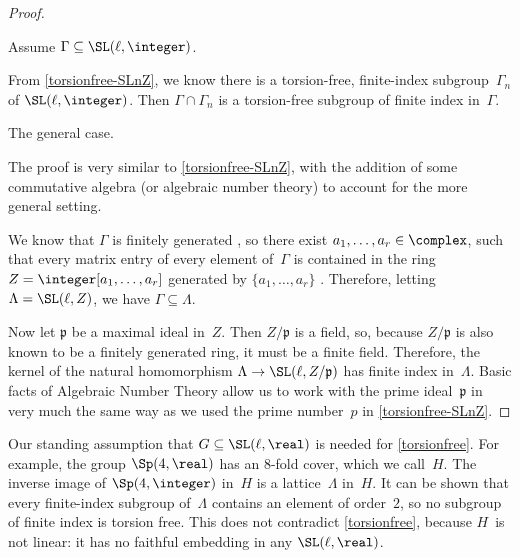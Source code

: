 \begin{proof}
\begin{case}
 Assume $\Gamma \subseteq \SL(\ell,\integer)$.
 \end{case}
  From \cref{torsionfree-SLnZ}, we know there is a
torsion-free, finite-index subgroup~$\Gamma_n$ of
$\SL(\ell, \integer)$. Then $\Gamma \cap \Gamma_n$ is a
torsion-free subgroup of finite index in~$\Gamma$.

\begin{case}
 The general case.
 \end{case}
 The proof is very similar to \cref{torsionfree-SLnZ},
with the addition of some commutative algebra (or
algebraic number theory) to account for the more general
setting.

 We know that $\Gamma$ is finitely generated ,
so there exist $a_1,\ldots,a_r \in \complex$, such that every
matrix entry of every element of~$\Gamma$ is contained in
the ring $Z = \integer[a_1,\ldots,a_r]$ generated by
$\{a_1,\ldots,a_r\}$ . Therefore, letting
 $\Lambda = \SL(\ell, Z)$,
 we have $\Gamma \subseteq \Lambda$.

Now let $\mathfrak{p}$ be a maximal ideal in~$Z$. Then
$Z/\mathfrak{p}$ is a field, so, because $Z/\mathfrak{p}$
is also known to be a finitely generated ring, it must be a
finite field. Therefore, the kernel of the natural homomorphism
$\Lambda \to \SL(\ell, Z/\mathfrak{p})$ has finite index
in~$\Lambda$. Basic facts of Algebraic Number Theory allow
us to work with the prime ideal~$\mathfrak{p}$ in very
much the same way as we used the prime number~$p$ in
\cref{torsionfree-SLnZ}.
 \end{proof}

\begin{warn} \label{NoTorsionFreeSubrgpWarn}
 Our standing assumption that $G \subseteq \SL(\ell,\real)$ is needed for \cref{torsionfree}.
For example, the group $\Sp(4,\real)$ has an $8$-fold cover, which we call~$H$.
The inverse image of $\Sp(4,\integer)$ in~$H$ is a lattice~$\Lambda$ in~$H$.
It can be shown that every finite-index subgroup of~$\Lambda$ contains an element
of order~$2$, so no subgroup of finite index is torsion free.
This does not contradict \cref{torsionfree}, because $H$~is not linear: it has no faithful embedding in any $\SL(\ell,\real)$.
 \end{warn}

